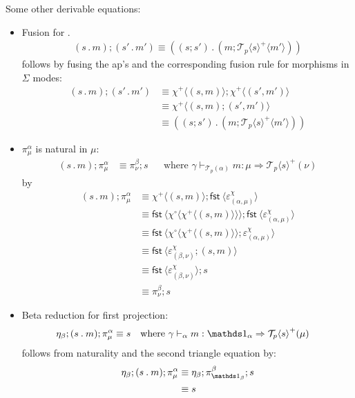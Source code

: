\documentclass[10pt]{article}
\theoremstyle{definition}
\newcommand\dsd[1]{\ensuremath{\mathsf{#1}}}
\newcommand{\tcell}{\Rightarrow}
\newcommand{\app}[2]{\ensuremath{#1 \: #2}}
\newcommand{\fst}[1]{\app{\dsd{fst}}{#1}}
\newcommand\TermTwoT[5]{\ensuremath{#1 \vdash_{#5} {#2} : #3 \tcell #4}}
\newcommand\TrPlus[2]{\ensuremath{{#1}^+(#2)}}
\newcommand\El[2]{\mathcal{T}_{#1}(#2)}
\newcommand\ApEl[2]{\mathcal{T}_{#1}\langle#2\rangle}
\newcommand\bdot[0]{\mathbin{.}}
\newcommand\ap[2]{\ensuremath{#1 \langle #2 \rangle }}
\newcommand\ApPlus[2]{\ensuremath{{#1}^+ \langle #2 \rangle }}
\newcommand\ApCirc[2]{\ensuremath{{#1}^\circ \langle #2 \rangle }}
\begin{document}
Some other derivable equations:
\begin{itemize}
\item Fusion for $.$
\begin{align}
\label{dot-fusion}
    (s \bdot m);(s' \bdot m') \equiv ((s;s') \bdot (m;\ApPlus{\ApEl{p}{s}} {m'}))
\end{align}
follows by fusing the ap's and the corresponding fusion rule for morphisms in $\Sigma$ modes:
\begin{align*}
(s \bdot m);(s' \bdot m') &\equiv \ApPlus{\chi}{(s, m)} ; \ApPlus{\chi}{(s', m')} \\
&\equiv \ApPlus{\chi}{(s, m);(s', m')} \\
&\equiv ((s;s') \bdot (m;\ApPlus{\ApEl{p}{s}} {m'}))
\end{align*}

\item $\pi^\alpha_\mu$ is natural in $\mu$:
  \begin{align}
  \label{pi-naturality}
  (s \bdot m); \pi^\alpha_\mu &\equiv \pi^\beta_\nu;s && \text{where } \TermTwoT{\gamma}{m}{\mu}{\TrPlus{\ApEl{p}{s}}{\nu}}{\El{p}{\alpha}}
  \end{align}
  by
  \begin{align*}
  (s \bdot m); \pi^\alpha_\mu 
  &\equiv \ApPlus{\chi}{(s, m)} ; \ap \fst {\varepsilon^\chi_{(\alpha, \mu)}} \\  
  &\equiv \ap{\fst}{\ApCirc{\chi}{\ApPlus{\chi}{(s, m)}}} ; \ap \fst {\varepsilon^\chi_{(\alpha, \mu)}} \\
  &\equiv \ap{\fst}{\ApCirc{\chi}{\ApPlus{\chi}{(s, m)}} ; \varepsilon^\chi_{(\alpha, \mu)}}  \\
  &\equiv \ap{\fst}{\varepsilon^\chi_{(\beta, \nu)}; (s, m) } \\
  &\equiv \ap{\fst}{\varepsilon^\chi_{(\beta, \nu)}} ; s\\
  &\equiv \pi^\beta_\nu ; s
  \end{align*}

\item Beta reduction for first projection:
  \begin{align}
\label{beta-pi}
\eta_\beta;(s \bdot m);\pi^\alpha_\mu &\equiv s && \text{where } \TermTwoT{\gamma}{m}{\One_\alpha}{\TrPlus{\ApEl{p}{s}}{\mu}}{\alpha}
  \end{align}
follows from naturality and the second triangle equation by:
\begin{align*}
\eta_\beta;(s \bdot m);\pi^\alpha_\mu
&\equiv \eta_\beta;\pi^\beta_{\One_\beta};s \\
&\equiv s
\end{align*}


\end{itemize}
\end{document}
